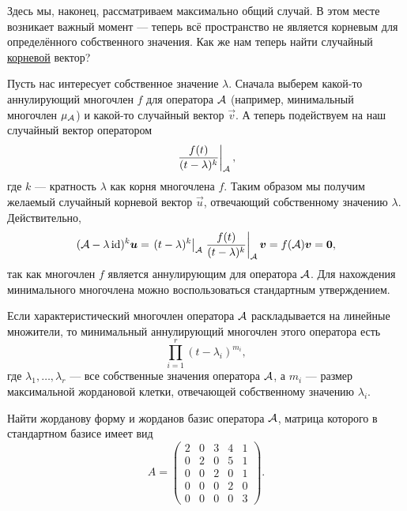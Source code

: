 \medskip
{}
\smallskip

Здесь мы, наконец, рассматриваем максимально общий случай. В этом месте возникает важный момент --- теперь всё пространство не является корневым для определённого собственного значения. Как же нам теперь найти случайный \underline{корневой} вектор?

Пусть нас интересует собственное значение $\lambda$. Сначала выберем какой-то аннулирующий многочлен $f$ для оператора $\mathcal{A}$ (например, минимальный многочлен $\mu_{\mathcal{A}}$) и какой-то случайный вектор $\vec{v}$. А теперь подействуем на наш случайный вектор оператором
\[
	\left.\frac{f(t)}{(t - \lambda)^k}\right|_{\mathcal{A}},
\]
где $k$ --- кратность $\lambda$ как корня многочлена $f$. Таким образом мы получим желаемый случайный корневой вектор $\vec{u}$, отвечающий собственному значению $\lambda$. Действительно,
\[
	(\mathcal{A} - \lambda\operatorname{id})^k\boldsymbol{u} = \left.(t - \lambda)^k\right|_{\mathcal{A}}\left.\frac{f(t)}{(t - \lambda)^k}\right|_{\mathcal{A}}\boldsymbol{v} = f(\mathcal{A})\boldsymbol{v} = \boldsymbol{0},
\]
так как многочлен $f$ является аннулирующим для оператора $\mathcal{A}$. Для нахождения минимального многочлена можно воспользоваться стандартным утверждением.

\begin{proposition}
	Если характеристический многочлен оператора $\mathcal{A}$ раскладывается на линейные множители, то минимальный аннулирующий многочлен этого оператора есть
	\[
		\prod_{i = 1}^r(t - \lambda_i)^{m_i},
	\]
	где $\lambda_1, \ldots, \lambda_r$ --- все собственные значения оператора $\mathcal{A}$, а $m_i$ --- размер максимальной жордановой клетки, отвечающей собственному значению $\lambda_i$.
\end{proposition}

\begin{problem}
	Найти жорданову форму и жорданов базис оператора $\mathcal{A}$, матрица которого в стандартном базисе имеет вид
	\[
		A =
		\begin{pmatrix}
			2 & 0 & 3 & 4 & 1\\
			0 & 2 & 0 & 5 & 1\\
			0 & 0 & 2 & 0 & 1\\
			0 & 0 & 0 & 2 & 0\\
			0 & 0 & 0 & 0 & 3
		\end{pmatrix}.
	\]
\end{problem}

